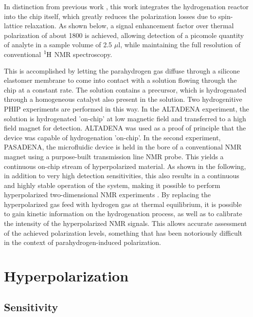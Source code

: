  In distinction from previous work
 \cite{bhattacharya2007towards,chekmenev2008pasadena,
 chekmenev2009hyperpolarized,shchepin2014parahydrogen,
 Reineri:2015he,cavallari201813,eills2017singlet,Lehmkuhl:2018cd},
 this work integrates the hydrogenation reactor into the chip itself, which greatly
 reduces the polarization losses due to spin-lattice relaxation.
 As shown below, a signal enhancement factor over thermal polarization
 of about 1800 is achieved, allowing detection of a
 picomole quantity of analyte in a sample volume of 2.5 $\mu$l,
 while maintaining the full resolution of conventional $\ce{^1H}$
 NMR spectroscopy.

 This is accomplished by letting the parahydrogen gas diffuse through a
 silicone elastomer membrane \cite{Lehmkuhl:2018cd}
 to come into contact with a solution
 flowing through the chip at a constant rate. The solution
 contains a precursor, which is hydrogenated through a homogeneous
 catalyst also present in the solution. Two hydrogenitive PHIP experiments are performed in
 this way. In the ALTADENA experiment, the solution is hydrogenated 'on-chip' at low magnetic field
 and transferred to a high field magnet for detection. ALTADENA was used as a proof of principle that the device
 was capable of hydrogenation 'on-chip'. In the second experiment, PASADENA,
 the microfluidic device is held in the bore of a conventional
 NMR magnet using a purpose-built transmission line NMR probe.
 This yields a continuous on-chip stream of hyperpolarized material. As shown
 in the following, in addition to very high detection
 sensitivities, this also results in a continuous and highly stable operation
 of the system, making it possible to perform hyperpolarized
 two-dimensional NMR experiments \cite{Roth:2010hk,Giraudeau:2009fn,Lloyd:2012cf,Eshuis:2015ce}.
 By replacing the hyperpolarized gas feed with hydrogen gas at thermal
 equilibrium, it is possible to gain kinetic information on the hydrogenation
 process, as well as to calibrate the intensity of the hyperpolarized NMR signals.
 This allows accurate assessment of the achieved polarization levels, something
 that has been notoriously difficult in the context of
 parahydrogen-induced polarization.

 \section{Hyperpolarization}


 \subsection{Sensitivity}\label{Sensitivity}

